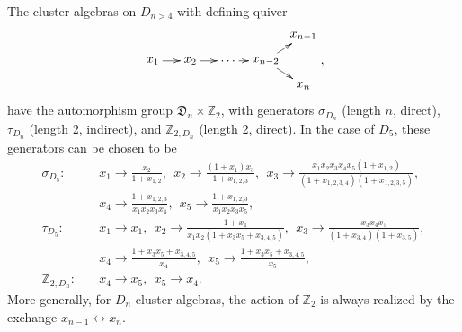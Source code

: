 \documentclass[11pt]{article}
\begin{document}
The cluster algebras on $D_{n>4}$ with defining quiver
\begin{equation}
    \begin{gathered}
    \begin{xy} 0;<1pt,0pt>:<0pt,-1pt>::
      (0,20) *+{x_1} ="1",
      (30,20) *+{x_2} ="2",
      (60,20) *+{\ldots} ="3",
      (90,20) *+{x_{n-2}} ="4",
      (120,0) *+{x_{n-1}} ="5",
      (120,40) *+{x_{n}} ="6",
      "1", {\ar"2"},
      "2", {\ar"3"},
      "3", {\ar"4"},
      "4", {\ar"5"},
      "4", {\ar"6"},
    \end{xy}
    \end{gathered},
\end{equation}
have the automorphism group ${\mathfrak D}_n \times \mathbb{Z}_2$, with generators $\sigma_{D_n}$ (length $n$, direct), $\tau_{D_n}$ (length 2, indirect), and $\mathbb{Z}_{2,D_n}$ (length 2, direct). In the case of $D_5$, these generators can be chosen to be
\vspace{.1cm}
\begin{equation}
\begin{split}
  \sigma_{D_5}:\quad& 
    x_1\to \frac{x_2}{1+x_{1,2}},~~
    x_2\to \frac{(1+x_1) x_3}{1+x_{1,2,3}},~~
    x_3\to \frac{x_1 x_2 x_3 x_4 x_5 (1+x_{1,2})}{(1+x_{1,2,3,4}) (1+x_{1,2,3,5})},\\&
    x_4\to \frac{1+x_{1,2,3}}{x_1 x_2 x_3 x_4},~~
    x_5\to \frac{1+x_{1,2,3}}{x_1 x_2 x_3 x_5},\\[2ex]
  \tau_{D_5}:\quad& 
    x_1\to x_1,~~
    x_2\to \frac{1+x_1}{x_1 x_2 (1+x_3 x_5+x_{3,4,5})},~~
    x_3\to \frac{x_3 x_4 x_5}{(1+x_{3,4}) (1+x_{3,5})},\\&
    x_4\to \frac{1+x_3 x_5+x_{3,4,5}}{x_4},~~
    x_5\to \frac{1+x_3 x_5+x_{3,4,5}}{x_5}, \\[2ex]
    \mathbb{Z}_{2,D_n}:\quad& x_4 \to x_5,~~ x_5 \to x_4.
\end{split}  
\end{equation}
More generally, for $D_n$ cluster algebras, the action of $\mathbb{Z}_2$ is always realized by the exchange $x_{n-1} \leftrightarrow x_n$. 
\end{document}
